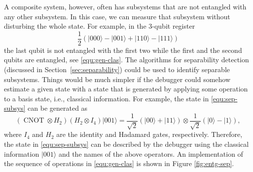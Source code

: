 \documentclass[11pt]{article}
\theoremstyle{plain}
\theoremstyle{definition}
\newcommand{\ldbrac}[1]{\lvert#1\rangle}
\begin{document}
A composite system, however, often has subsystems that are not entangled with any other subsystem. 
In 
this case, we can measure that subsystem without disturbing the whole state. For example, in the 
3-qubit register
\begin{equation}
\label{equ:sep-subsys}
	\frac{1}{2} (\ldbrac{000} - \ldbrac{001} + \ldbrac{110} - \ldbrac{111})
\end{equation}
the last qubit is not entangled with the first two while the first and the second qubits are 
entangled, see \eqref{equ:gen-clas}. The algorithms for separability detection (discussed in 
Section~\ref{sec:separability})  could be used to identify separable subsystems. 
Things would be much simpler if the debugger could somehow estimate a given state with a state that 
is generated by applying some operation to a basis state, i.e., classical information. For example, 
the state in \eqref{equ:sep-subsys} can be generated as
\begin{equation}
\label{equ:gen-clas}
    (\operatorname{CNOT} \otimes H_2) (H_2 \otimes I_4) \ldbrac{001} = 
    \frac{1}{\sqrt{2}}(\ldbrac{00} + 
    \ldbrac{11}) \otimes \frac{1}{\sqrt{2}}(\ldbrac{0} - \ldbrac{1}),
\end{equation}
where $I_4$ and $H_2$ are the identity and Hadamard gates, respectively. Therefore, the state in 
\eqref{equ:sep-subsys} can be described by the debugger using the classical information 
$\ldbrac{001}$ and the names of the above operators. An implementation of the sequence of 
operations in \eqref{equ:gen-clas} is 
shown in Figure \ref{fig:entg-sep}.
\end{document}
